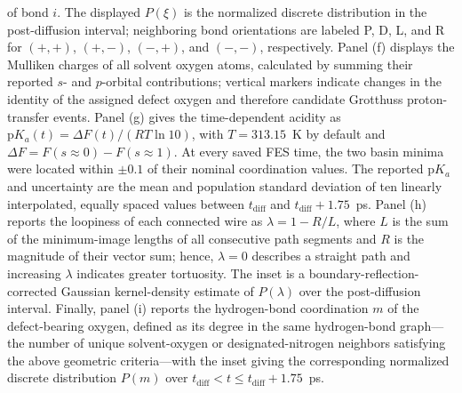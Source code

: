 \documentclass[10pt]{article}
\begin{document}
{\begin{minipage}{0.96\textwidth}
of bond $i$. The displayed $P(\xi)$ is the normalized discrete distribution in the post-diffusion interval; neighboring bond orientations are labeled P, D, L, and R for $(+,+)$, $(+,-)$, $(-,+)$, and $(-,-)$, respectively. Panel (f) displays the Mulliken charges of all solvent oxygen atoms, calculated by summing their reported $s$- and $p$-orbital contributions; vertical markers indicate changes in the identity of the assigned defect oxygen and therefore candidate Grotthuss proton-transfer events. Panel (g) gives the time-dependent acidity as $\mathrm{p}K_a(t)=\Delta F(t)/(RT\ln10)$, with $T=313.15$~K by default and $\Delta F=F(s\approx0)-F(s\approx1)$. At every saved FES time, the two basin minima were located within $\pm0.1$ of their nominal coordination values. The reported $\mathrm{p}K_a$ and uncertainty are the mean and population standard deviation of ten linearly interpolated, equally spaced values between $t_{\mathrm{diff}}$ and $t_{\mathrm{diff}}+1.75$~ps. Panel (h) reports the loopiness of each connected wire as $\lambda=1-R/L$, where $L$ is the sum of the minimum-image lengths of all consecutive path segments and $R$ is the magnitude of their vector sum; hence, $\lambda=0$ describes a straight path and increasing $\lambda$ indicates greater tortuosity. The inset is a boundary-reflection-corrected Gaussian kernel-density estimate of $P(\lambda)$ over the post-diffusion interval. Finally, panel (i) reports the hydrogen-bond coordination $m$ of the defect-bearing oxygen, defined as its degree in the same hydrogen-bond graph---the number of unique solvent-oxygen or designated-nitrogen neighbors satisfying the above geometric criteria---with the inset giving the corresponding normalized discrete distribution $P(m)$ over $t_{\mathrm{diff}}<t\leq t_{\mathrm{diff}}+1.75$~ps.
\end{minipage}%
}
\end{document}
